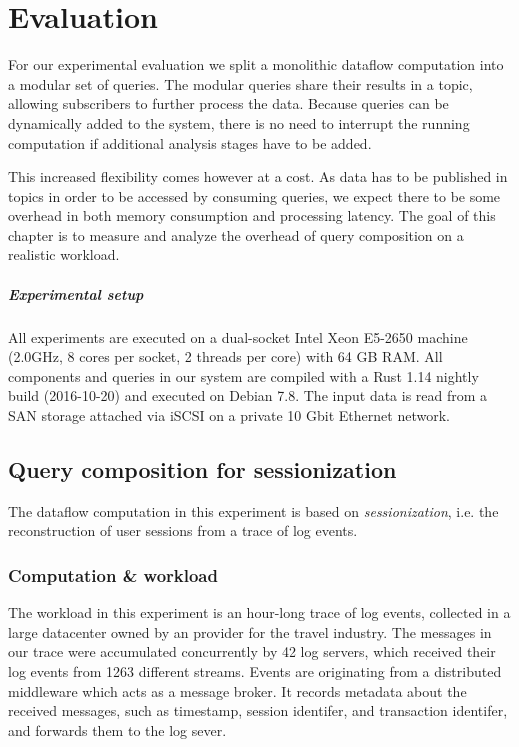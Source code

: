 \chapter{Evaluation}\label{ch:evaluation}

For our experimental evaluation we split a monolithic dataflow computation into a
modular set of queries. The modular queries share their results in a topic,
allowing subscribers to further process the data. Because queries
can be dynamically added to the system, there is no need to interrupt the
running computation if additional analysis stages have to be added.

This increased flexibility comes however at a cost. As data has to be published
in topics in order to be accessed by consuming queries, we expect there to be
some overhead in both memory consumption and processing latency. The goal
of this chapter is to measure and analyze the overhead of query composition
on a realistic workload.

\paragraph{Experimental setup}

All experiments are executed on a dual-socket Intel Xeon E5-2650
machine (2.0GHz, 8 cores per socket, 2 threads per core) with 64 GB RAM. All components and
queries in our system are compiled with a Rust 1.14 nightly build (2016-10-20)
and executed on Debian 7.8. The input data is read from a SAN storage attached
via iSCSI on a private 10 Gbit Ethernet network.

\section{Query composition for sessionization}

The dataflow computation in this experiment is based on \emph{sessionization},
i.e. the reconstruction of user sessions from a trace of log events.

\subsection{Computation \& workload}

The workload in this experiment is an hour-long trace of log events, collected in
a large datacenter owned by an provider for the travel industry. The messages in our trace were
accumulated concurrently by 42 log servers, which received their log events from
1263 different streams. Events are originating from a distributed middleware which acts
as a message broker. It records metadata about the received messages, such as
timestamp, session identifer, and transaction identifer, and forwards them to
the log sever.


